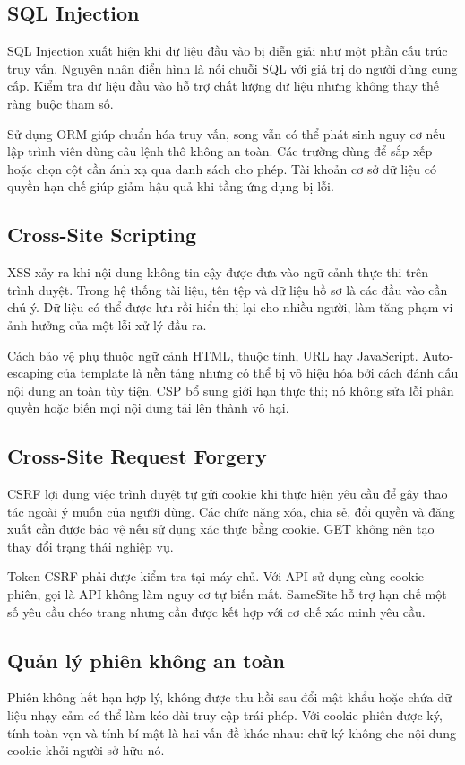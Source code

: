 \subsection{SQL Injection}
SQL Injection xuất hiện khi dữ liệu đầu vào bị diễn giải như một phần cấu trúc truy vấn. Nguyên nhân điển hình là nối chuỗi SQL với giá trị do người dùng cung cấp. Kiểm tra dữ liệu đầu vào hỗ trợ chất lượng dữ liệu nhưng không thay thế ràng buộc tham số.

Sử dụng ORM giúp chuẩn hóa truy vấn, song vẫn có thể phát sinh nguy cơ nếu lập trình viên dùng câu lệnh thô không an toàn. Các trường dùng để sắp xếp hoặc chọn cột cần ánh xạ qua danh sách cho phép. Tài khoản cơ sở dữ liệu có quyền hạn chế giúp giảm hậu quả khi tầng ứng dụng bị lỗi.
\subsection{Cross-Site Scripting}
XSS xảy ra khi nội dung không tin cậy được đưa vào ngữ cảnh thực thi trên trình duyệt. Trong hệ thống tài liệu, tên tệp và dữ liệu hồ sơ là các đầu vào cần chú ý. Dữ liệu có thể được lưu rồi hiển thị lại cho nhiều người, làm tăng phạm vi ảnh hưởng của một lỗi xử lý đầu ra.

Cách bảo vệ phụ thuộc ngữ cảnh HTML, thuộc tính, URL hay JavaScript. Auto-escaping của template là nền tảng nhưng có thể bị vô hiệu hóa bởi cách đánh dấu nội dung an toàn tùy tiện. CSP bổ sung giới hạn thực thi; nó không sửa lỗi phân quyền hoặc biến mọi nội dung tải lên thành vô hại.
\subsection{Cross-Site Request Forgery}
CSRF lợi dụng việc trình duyệt tự gửi cookie khi thực hiện yêu cầu để gây thao tác ngoài ý muốn của người dùng. Các chức năng xóa, chia sẻ, đổi quyền và đăng xuất cần được bảo vệ nếu sử dụng xác thực bằng cookie. GET không nên tạo thay đổi trạng thái nghiệp vụ.

Token CSRF phải được kiểm tra tại máy chủ. Với API sử dụng cùng cookie phiên, gọi là API không làm nguy cơ tự biến mất. SameSite hỗ trợ hạn chế một số yêu cầu chéo trang nhưng cần được kết hợp với cơ chế xác minh yêu cầu.
\subsection{Quản lý phiên không an toàn}
Phiên không hết hạn hợp lý, không được thu hồi sau đổi mật khẩu hoặc chứa dữ liệu nhạy cảm có thể làm kéo dài truy cập trái phép. Với cookie phiên được ký, tính toàn vẹn và tính bí mật là hai vấn đề khác nhau: chữ ký không che nội dung cookie khỏi người sở hữu nó.

